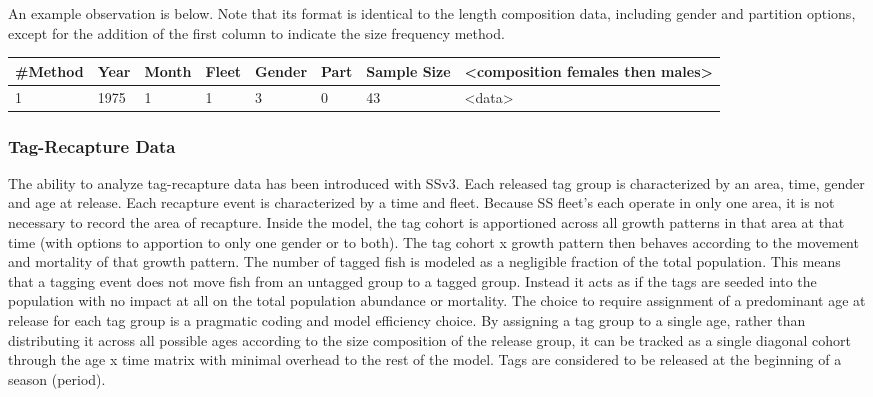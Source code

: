 An example observation is below.  Note that its format is identical to the length composition data, including gender and partition options, except for the addition of the first column to indicate the size frequency method.

\begin{center}
	\begin{tabular}{p{1.5cm} p{1cm} p{1cm} p{1cm} p{1cm} p{1cm} p{1cm} p{5cm}}
		\hline
		\#Method & Year & Month & Fleet & Gender & Part & Sample Size & <composition females then males>\\
		\hline
		1 & 1975 & 1 & 1 & 3 & 0 & 43 & <data> \\
		\hline
	\end{tabular}
\end{center}

\subsubsection{Tag-Recapture Data}
The ability to analyze tag-recapture data has been introduced with SS\textunderscore v3.  Each released tag group is characterized by an area, time, gender and age at release.  Each recapture event is characterized by a time and fleet.  Because SS fleet’s each operate in only one area, it is not necessary to record the area of recapture.  Inside the model, the tag cohort is apportioned across all growth patterns in that area at that time (with options to apportion to only one gender or to both).  The tag cohort x growth pattern then behaves according to the movement and mortality of that growth pattern.  The number of tagged fish is modeled as a negligible fraction of the total population.  This means that a tagging event does not move fish from an untagged group to a tagged group.  Instead it acts as if the tags are seeded into the population with no impact at all on the total population abundance or mortality.  The choice to require assignment of a predominant age at release for each tag group is a pragmatic coding and model efficiency choice.  By assigning a tag group to a single age, rather than distributing it across all possible ages according to the size composition of the release group, it can be tracked as a single diagonal cohort through the age x time matrix with minimal overhead to the rest of the model.  Tags are considered to be released at the beginning of a season (period).

